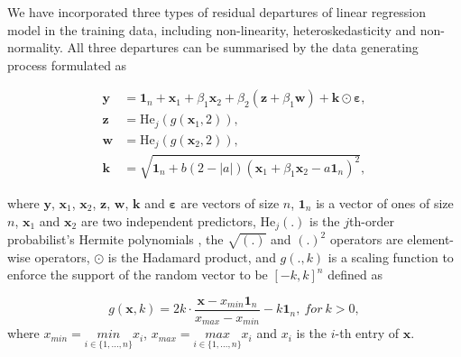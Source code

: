 \documentclass[]{interact}
\theoremstyle{plain}%
\theoremstyle{definition}
\theoremstyle{remark}
\begin{document}
We have incorporated three types of residual departures of linear
regression model in the training data, including non-linearity,
heteroskedasticity and non-normality. All three departures can be
summarised by the data generating process formulated as

\begin{align}
\label{eq:data-sim}
\boldsymbol{y} &= \boldsymbol{1}_n + \boldsymbol{x}_1 + \beta_1\boldsymbol{x}_2 + \beta_2(\boldsymbol{z} + \beta_1\boldsymbol{w}) + \boldsymbol{k} \odot \boldsymbol{\varepsilon}, \\
\boldsymbol{z} &= \text{He}_j(g(\boldsymbol{x}_1, 2)), \\
\boldsymbol{w} &= \text{He}_j(g(\boldsymbol{x}_2, 2)), \\
\boldsymbol{k} &= \sqrt{\boldsymbol{1}_n + b(2 - |a|)(\boldsymbol{x}_1 + \beta_1\boldsymbol{x}_2 - a\boldsymbol{1}_n)^2},
\end{align}

\noindent where \(\boldsymbol{y}\), \(\boldsymbol{x}_1\),
\(\boldsymbol{x}_2\), \(\boldsymbol{z}\), \(\boldsymbol{w}\),
\(\boldsymbol{k}\) and \(\boldsymbol{\varepsilon}\) are vectors of size
\(n\), \(\boldsymbol{1}_n\) is a vector of ones of size \(n\),
\(\boldsymbol{x}_1\) and \(\boldsymbol{x}_2\) are two independent
predictors, \(\text{He}_j(.)\) is the \(j\)th-order probabilist's
Hermite polynomials \citep{hermite1864nouveau}, the \(\sqrt{(.)}\) and
\((.)^2\) operators are element-wise operators, \(\odot\) is the
Hadamard product, and \(g(., k)\) is a scaling function to enforce the
support of the random vector to be \([-k, k]^n\) defined as

\[g(\boldsymbol{x}, k) = 2k \cdot \frac{\boldsymbol{x} - x_{min}\boldsymbol{1}_n}{x_{max} - x_{min}} - k\boldsymbol{1}_n,~for~k > 0,\]
\noindent where \(x_{min} = \underset{i \in \{ 1,...,n\}}{min} x_i\),
\(x_{max} = \underset{i \in \{ 1,...,n\}}{max} x_i\) and \(x_i\) is the
\(i\)-th entry of \(\boldsymbol{x}\).
\end{document}
